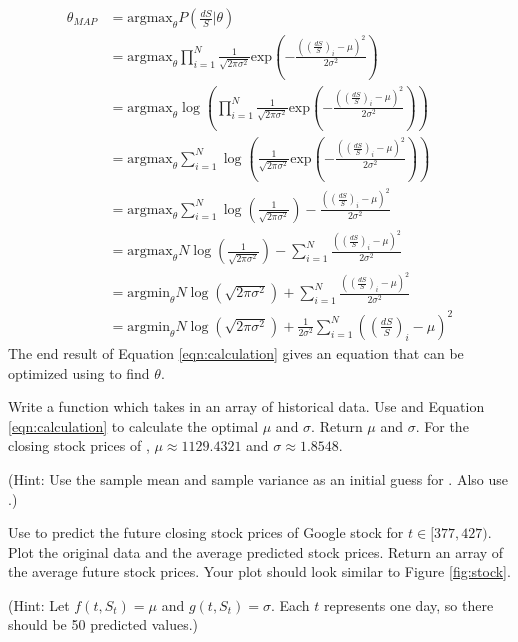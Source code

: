 \begin{equation}
\begin{split}
\theta_{MAP}&=\text{argmax}_\theta P(\frac{dS}{S}|\theta)\\
&=\text{argmax}_{\theta}\prod_{i=1}^N\frac{1}{\sqrt{2\pi \sigma^2}}\text{exp}(-\frac{((\frac{dS}{S})_i-\mu)^2}{2\sigma^2})\\
&=\text{argmax}_{\theta}\log(\prod_{i=1}^N\frac{1}{\sqrt{2\pi \sigma^2}}\text{exp}(-\frac{((\frac{dS}{S})_i-\mu)^2}{2\sigma^2}))\\
&=\text{argmax}_{\theta}\sum_{i=1}^N\log(\frac{1}{\sqrt{2\pi \sigma^2}}\text{exp}(-\frac{((\frac{dS}{S})_i-\mu)^2}{2\sigma^2}))\\
&=\text{argmax}_\theta\sum_{i=1}^N\log(\frac{1}{\sqrt{2\pi\sigma^2}})-\frac{((\frac{dS}{S})_i-\mu)^2}{2\sigma^2}\\
&=\text{argmax}_\theta N\log(\frac{1}{\sqrt{2\pi\sigma^2}})-\sum_{i=1}^N\frac{((\frac{dS}{S})_i-\mu)^2}{2\sigma^2}\\
&=\text{argmin}_\theta N\log(\sqrt{2\pi\sigma^2})+\sum_{i=1}^N\frac{((\frac{dS}{S})_i-\mu)^2}{2\sigma^2}\\
&=\text{argmin}_\theta N\log(\sqrt{2\pi\sigma^2})+\frac{1}{2\sigma^2}\sum_{i=1}^N((\frac{dS}{S})_i-\mu)^2
\end{split}
\label{eqn:calculation}
\end{equation}
The end result of Equation \ref{eqn:calculation} gives an equation that can be optimized using  to find $\theta$.

\begin{problem}
Write a function  which takes in an array of historical data.
Use  and Equation \ref{eqn:calculation} to calculate the optimal $\mu$ and $\sigma$.
Return $\mu$ and $\sigma$.
For the closing stock prices of , $\mu\approx1129.4321$ and $\sigma\approx1.8548$.

(Hint: Use the sample mean and sample variance as an initial guess for . Also use .)
\label{prob:theta}
\end{problem}

\begin{problem}
Use  to predict the future closing stock prices of Google stock for $t\in[377,427)$.
Plot the original data and the average predicted stock prices.
Return an array of the average future stock prices.
Your plot should look similar to Figure \ref{fig:stock}.

(Hint: Let $f(t,S_t)=\mu$ and $g(t,S_t)=\sigma$. Each $t$ represents one day, so there should be 50 predicted values.)
\label{stock}
\end{problem}


